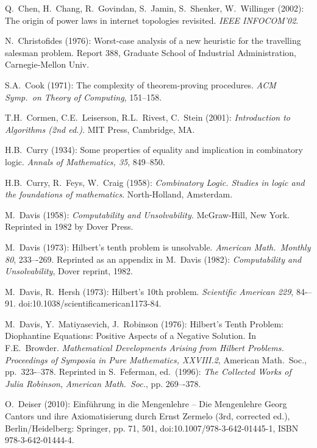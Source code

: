 \begin{thebibliography}{999}
Q.~Chen, H.~Chang, R.~Govindan, S.~Jamin, S.~Shenker,
W.~Willinger (2002):
The origin of power laws in internet topologies revisited.
{\it IEEE INFOCOM'02}.

N.~Christofides (1976):
Worst-case analysis of a new heuristic for the travelling salesman
problem.  Report 388, Graduate School of Industrial Administration,
Carnegie-Mellon Univ.

S.A.~Cook (1971): The complexity of theorem-proving procedures.  {\it
  ACM Symp.~on Theory of Computing}, 151--158.

T.H.~Cormen, C.E.~Leiserson, R.L.~Rivest, C.~Stein (2001):
{\it Introduction to Algorithms (2nd ed.)}.
MIT Press, Cambridge, MA.

H.B.~Curry (1934): Some properties of equality and implication in
combinatory logic.  {\it Annals of Mathematics, 35}, 849--850.

H.B.~Curry, R.~Feys, W.~Craig (1958):
{\it Combinatory Logic.  Studies in logic and the foundations of
mathematics}.  North-Holland, Amsterdam.


M.~Davis (1958):
{\it Computability and Unsolvability.}
McGraw-Hill, New York.  Reprinted in 1982 by Dover Press.

M.~Davis (1973):
Hilbert's tenth problem is unsolvable.
{\it American Math.~Monthly 80}, 233–-269.  Reprinted as an appendix
in M.~Davis (1982): {\it Computability and Unsolvability}, Dover
reprint, 1982.

M.~Davis, R.~Hersh (1973): 
Hilbert's 10th problem.  {\it Scientific American 229},
84-–91.  doi:10.1038/scientificamerican1173-84.

M.~Davis, Y.~Matiyasevich, J.~Robinson (1976): Hilbert's Tenth
Problem: Diophantine Equations: Positive Aspects of a Negative
Solution.  In F.E.~Browder.  {\it Mathematical Developments Arising
  from Hilbert Problems.}  {\it Proceedings of Symposia in Pure
  Mathematics, XXVIII.2}, American Math.~Soc., pp.~323-–378.
Reprinted in S.~Feferman, ed.~(1996): {\it The Collected Works of
  Julia Robinson}, {\it American Math.~Soc.}, pp. 269–-378.

O.~Deiser (2010): Einf\"{u}hrung in die Mengenlehre – Die Mengenlehre
Georg Cantors und ihre Axiomatisierung durch Ernst Zermelo (3rd,
corrected ed.), Berlin/Heidelberg: Springer, pp. 71, 501,
doi:10.1007/978-3-642-01445-1, ISBN 978-3-642-01444-4.



\end{thebibliography}
